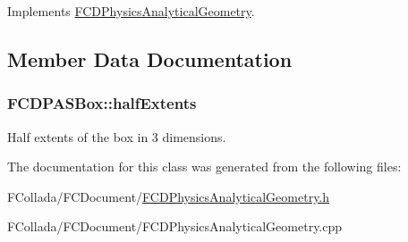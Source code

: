 Implements \hyperlink{classFCDPhysicsAnalyticalGeometry_a1902e92f195b227e7bee8799060e3084}{FCDPhysicsAnalyticalGeometry}.



\subsection{Member Data Documentation}
\hypertarget{classFCDPASBox_a1550f8088304f350f1dd3c92b123e82b}{
\subsubsection[{halfExtents}]{ {\bf FCDPASBox::halfExtents}}}
\label{classFCDPASBox_a1550f8088304f350f1dd3c92b123e82b}
Half extents of the box in 3 dimensions. 

The documentation for this class was generated from the following files:\begin{DoxyCompactItemize}
\item 
FCollada/FCDocument/\hyperlink{FCDPhysicsAnalyticalGeometry_8h}{FCDPhysicsAnalyticalGeometry.h}\item 
FCollada/FCDocument/FCDPhysicsAnalyticalGeometry.cpp\end{DoxyCompactItemize}
